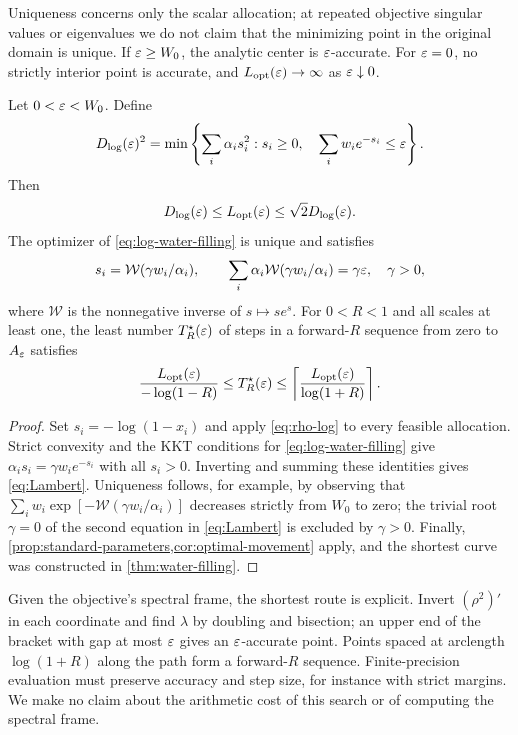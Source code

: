 Uniqueness concerns only the scalar allocation; at repeated objective
singular values or eigenvalues we do not claim that the minimizing point
in the original domain is unique. If $\varepsilon\geq W_0$, the analytic
center is $\varepsilon$-accurate. For $\varepsilon=0$, no strictly interior point is accurate, and
$L_{\mathrm{opt}}(\varepsilon)\to\infty$ as $\varepsilon\downarrow0$.

\begin{corollary}
\label{cor:water-movement}
Let $0<\varepsilon<W_0$. Define
\begin{equation}
 D_{\log}(\varepsilon)^2=
 \min\left\{\sum_i\alpha_i s_i^2:s_i\geq0,
                    \quad\sum_i w_i e^{-s_i}\leq\varepsilon\right\}.
 \label{eq:log-water-filling}
\end{equation}
Then
\begin{equation}
 D_{\log}(\varepsilon)\leq L_{\mathrm{opt}}(\varepsilon)\leq\sqrt2D_{\log}(\varepsilon).
 \label{eq:log-comparison}
\end{equation}
The optimizer of \eqref{eq:log-water-filling} is unique and satisfies
\begin{equation}
 s_i=\mathcal W(\gamma w_i/\alpha_i),\qquad
 \sum_i\alpha_i\mathcal W(\gamma w_i/\alpha_i)=\gamma\varepsilon,
 \quad\gamma>0,
 \label{eq:Lambert}
\end{equation}
where $\mathcal W$ is the nonnegative inverse of $s\mapsto s e^s$.
For $0<R<1$ and all scales at least one, the least number
$T_R^\star(\varepsilon)$ of steps in a forward-$R$ sequence from zero to
$A_\varepsilon$ satisfies
\begin{equation}
 \frac{L_{\mathrm{opt}}(\varepsilon)}{-\log(1-R)}
 \leq T_R^\star(\varepsilon)
 \leq\left\lceil\frac{L_{\mathrm{opt}}(\varepsilon)}{\log(1+R)}\right\rceil.
 \label{eq:exact-bounded-movement}
\end{equation}
\end{corollary}
\begin{proof}
Set $s_i=-\log(1-x_i)$ and apply \eqref{eq:rho-log} to every feasible
allocation. Strict convexity and the KKT conditions for
\eqref{eq:log-water-filling} give
$\alpha_i s_i=\gamma w_i e^{-s_i}$ with all $s_i>0$.
Inverting and summing these identities gives \eqref{eq:Lambert}.
Uniqueness follows, for example, by observing that
$\sum_iw_i\exp[-\mathcal W(\gamma w_i/\alpha_i)]$ decreases strictly
from $W_0$ to zero; the trivial root $\gamma=0$ of the second equation
in \eqref{eq:Lambert} is excluded by $\gamma>0$.
Finally, \cref{prop:standard-parameters,cor:optimal-movement} apply,
and the shortest curve was constructed in \cref{thm:water-filling}.
\end{proof}

Given the objective's spectral frame, the shortest route is explicit.
Invert $(\rho^2)'$ in each coordinate and find $\lambda$ by doubling
and bisection; an upper end of the bracket with gap at most $\varepsilon$
gives an $\varepsilon$-accurate point. Points spaced at arclength $\log(1+R)$
along the path form a forward-$R$ sequence. Finite-precision evaluation
must preserve accuracy and step size, for instance with strict margins.
We make no claim about the arithmetic cost of this search or of
computing the spectral frame.
